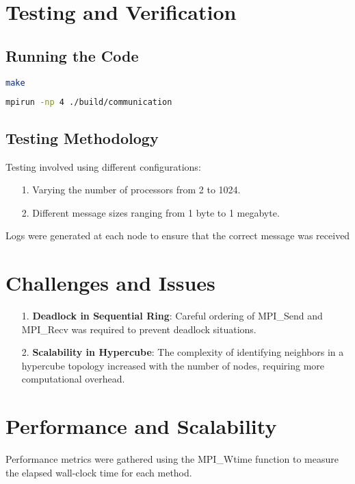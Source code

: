 \documentclass[11pt]{article}
\begin{document}
\section{Testing and Verification}
\subsection{Running the Code}

\begin{lstlisting}[language=bash,caption=Compiling the code]
make 
\end{lstlisting}

\begin{lstlisting}[language=bash,caption=Running the code]
mpirun -np 4 ./build/communication
\end{lstlisting}

\subsection{Testing Methodology}

Testing involved using different configurations:
\begin{itemize}
    \item [1.] Varying the number of processors from 2 to 1024.
    \item [2.] Different message sizes ranging from 1 byte to 1 megabyte.
\end{itemize}
Logs were generated at each node to ensure that the correct message was received

\section{Challenges and Issues}
\begin{itemize}
    \item [1.] \textbf{Deadlock in Sequential Ring}: Careful ordering of MPI\_Send and MPI\_Recv was required to prevent deadlock situations.
    \item [2.] \textbf{Scalability in Hypercube}: The complexity of identifying neighbors in a hypercube topology increased with the number of nodes, requiring more computational overhead.
\end{itemize}

\section{Performance and Scalability}

Performance metrics were gathered using the MPI\_Wtime function to measure the elapsed wall-clock time for each method.
\end{document}

